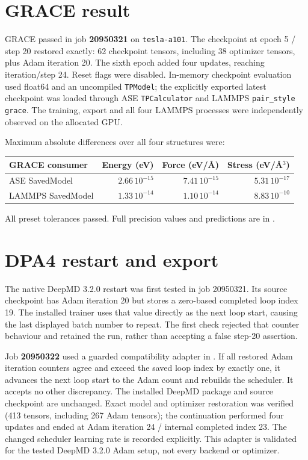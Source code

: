 \documentclass[10pt,a4paper]{article}
\begin{document}
\section{GRACE result}
GRACE passed in job \textbf{20950321} on \texttt{tesla-a101}. The checkpoint at
epoch 5 / step 20 restored exactly: 62 checkpoint tensors, including 38 optimizer
tensors, plus Adam iteration 20. The sixth epoch added four updates, reaching
iteration/step 24. Reset flags were disabled. In-memory checkpoint evaluation
used float64 and an uncompiled \texttt{TPModel}; the explicitly exported latest
checkpoint was loaded through ASE \texttt{TPCalculator} and LAMMPS
\texttt{pair\_style grace}. The training, export and all four LAMMPS processes
were independently observed on the allocated GPU.

Maximum absolute differences over all four structures were:
\begin{center}
\begin{tabular}{@{}lrrr@{}}
\toprule
GRACE consumer & Energy (eV) & Force (eV/\AA) & Stress (eV/\AA$^3$) \\
\midrule
ASE SavedModel & $2.66\,10^{-15}$ & $7.41\,10^{-15}$ & $5.31\,10^{-17}$ \\
LAMMPS SavedModel & $1.33\,10^{-14}$ & $1.10\,10^{-14}$ & $8.83\,10^{-10}$ \\
\bottomrule
\end{tabular}
\end{center}
All preset tolerances passed. Full precision values and predictions are in
.

\section{DPA4 restart and export}
The native DeepMD 3.2.0 restart was first tested in job 20950321. Its source
checkpoint has Adam iteration 20 but stores a zero-based completed loop index 19.
The installed trainer uses that value directly as the next loop start, causing
the last displayed batch number to repeat. The first check rejected that counter
behaviour and retained the run, rather than accepting a false step-20 assertion.

Job \textbf{20950322} used a guarded compatibility adapter in
. If all restored Adam iteration counters agree
and exceed the saved loop index by exactly one, it advances the next loop start
to the Adam count and rebuilds the scheduler. It accepts no other discrepancy.
The installed DeepMD package and source checkpoint are unchanged. Exact model
and optimizer restoration was verified (413 tensors, including 267 Adam tensors);
the continuation performed four updates
and ended at Adam iteration 24 / internal completed index 23. The changed
scheduler learning rate is recorded explicitly. This adapter is validated for
the tested DeepMD 3.2.0 Adam setup, not every backend or optimizer.
\end{document}
